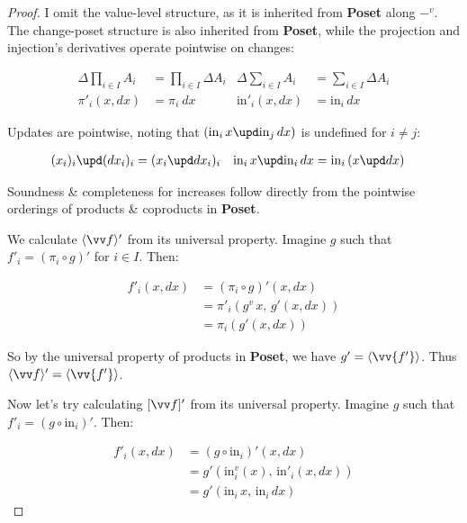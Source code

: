 \documentclass{rntz}
\newcommand\cat\textbf
\newcommand\Poset{\cat{Poset}}
\newcommand\D\Delta
\newcommand\injc{\mathrm{in}}
\newcommand\inj[1]{\injc_{#1}\,}
\newcommand\vals[1]{#1^v} %
\newcommand\valfn{\ensuremath{\vals{-}}}
\newcommand\chgs[1]{\D{#1}}
\newcommand\funct[1]{\vals{#1}}
\newcommand\deriv[1]{#1'}
\newcommand\fork[1]{\langle{#1}\rangle}
\newcommand\krof[1]{[{#1}]}
\begin{document}
\begin{proof}
  I omit the value-level structure, as it is inherited from \Poset{} along
  \valfn{}. The change-poset structure is also inherited from \Poset{}, while
  the projection and injection's derivatives operate pointwise on changes:

  \begin{align*}
    \chgs{\prod_{i \in I} A_i} &= \prod_{i \in I} \chgs A_i &
    \chgs{\sum_{i \in I} A_i} &= \sum_{i \in I} \chgs A_i
    \\
    \deriv\pi_i(x,dx) &= \pi_i~dx & \deriv\injc_i(x,dx) &= \inj i dx
  \end{align*}

  \noindent Updates are pointwise, noting that $(\inj i x \upd \inj j dx)$ is
  undefined for $i \ne j$:

  \begin{align*}
    (x_i)_i \upd (dx_i)_i &= (x_i \upd dx_i)_i &
    \inj i x \upd \inj i dx &= \inj i (x \upd dx)
  \end{align*}

  \noindent
  Soundness \& completeness for increases follow directly from the pointwise
  orderings of products \& coproducts in \Poset{}.

  We calculate $\deriv{\fork{\vv f}}$ from its universal property. Imagine $g$
  such that $\deriv f_i = (\pi_i \circ g)'$ for $i \in I$. Then:

  \begin{align*}
    \deriv f_i(x,dx) &= \deriv{(\pi_i \circ g)} (x,dx)\\
    &= \deriv\pi_i(\funct g\,x,\, \deriv g(x,dx))\\
    &= \pi_i (\deriv g(x,dx))
  \end{align*}

  \noindent
  So by the universal property of products in \Poset{}, we have $\deriv g =
  \fork{\vv{\deriv f}}$. Thus $\deriv{\fork{\vv f}} = \fork{\vv{\deriv f}}$.

  Now let's try calculating $\deriv{\krof{\vv f}}$ from its universal property.
  Imagine $g$ such that $\deriv f_i = \deriv{(g \circ \injc_i)}$. Then:

  \begin{align*}
    \deriv f_i(x,dx) &= \deriv{(g \circ \injc_i)}(x,dx)\\
    &= \deriv g(\funct\injc_i(x),\, \deriv\injc_i(x,dx))\\
    &= \deriv g(\inj i x,\, \inj i dx)
  \end{align*}


\end{proof}
\end{document}
